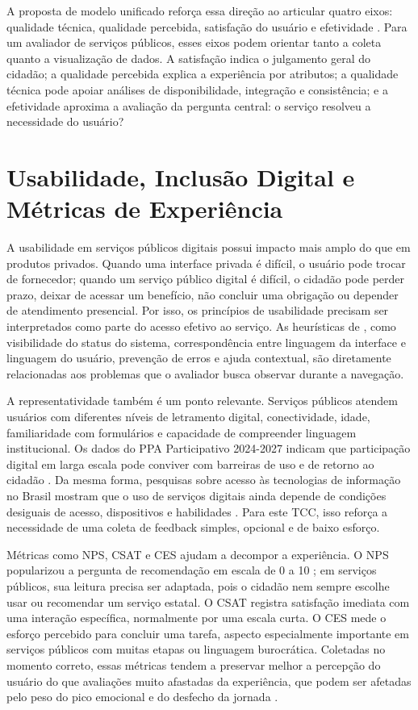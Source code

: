A proposta de modelo unificado reforça essa direção ao articular quatro eixos:
qualidade técnica, qualidade percebida, satisfação do usuário e efetividade
\cite{silva2022modeloUnificado}. Para um avaliador de serviços públicos, esses
eixos podem orientar tanto a coleta quanto a visualização de dados. A satisfação
indica o julgamento geral do cidadão; a qualidade percebida explica a experiência
por atributos; a qualidade técnica pode apoiar análises de disponibilidade,
integração e consistência; e a efetividade aproxima a avaliação da pergunta
central: o serviço resolveu a necessidade do usuário?

\section{Usabilidade, Inclusão Digital e Métricas de Experiência}

A usabilidade em serviços públicos digitais possui impacto mais amplo do que em
produtos privados. Quando uma interface privada é difícil, o usuário pode trocar
de fornecedor; quando um serviço público digital é difícil, o cidadão pode perder
prazo, deixar de acessar um benefício, não concluir uma obrigação ou depender de
atendimento presencial. Por isso, os princípios de usabilidade precisam ser
interpretados como parte do acesso efetivo ao serviço. As heurísticas de
, como visibilidade do status do sistema,
correspondência entre linguagem da interface e linguagem do usuário, prevenção de
erros e ajuda contextual, são diretamente relacionadas aos problemas que o
avaliador busca observar durante a navegação.

A representatividade também é um ponto relevante. Serviços públicos atendem
usuários com diferentes níveis de letramento digital, conectividade, idade,
familiaridade com formulários e capacidade de compreender linguagem
institucional. Os dados do PPA Participativo 2024-2027 indicam que participação
digital em larga escala pode conviver com barreiras de uso e de retorno ao
cidadão \cite{brasilMgi2024ppaParticipativo}. Da mesma forma, pesquisas sobre
acesso às tecnologias de informação no Brasil mostram que o uso de serviços
digitais ainda depende de condições desiguais de acesso, dispositivos e
habilidades \cite{cetic2025ticDomicilios2024}. Para este TCC, isso reforça a
necessidade de uma coleta de feedback simples, opcional e de baixo esforço.

Métricas como NPS, CSAT e CES ajudam a decompor a experiência. O NPS popularizou
a pergunta de recomendação em escala de 0 a 10 \cite{reichheld2003nps}; em
serviços públicos, sua leitura precisa ser adaptada, pois o cidadão nem sempre
escolhe usar ou recomendar um serviço estatal. O CSAT registra satisfação
imediata com uma interação específica, normalmente por uma escala curta. O CES
mede o esforço percebido para concluir uma tarefa, aspecto especialmente
importante em serviços públicos com muitas etapas ou linguagem burocrática.
Coletadas no momento correto, essas métricas tendem a preservar melhor a
percepção do usuário do que avaliações muito afastadas da experiência, que podem
ser afetadas pelo peso do pico emocional e do desfecho da jornada
\cite{kahneman1993peakEnd}.

